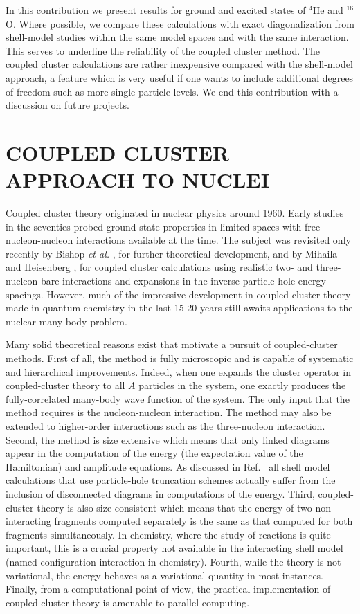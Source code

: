 \documentclass[fleqn,12pt,twoside]{article}
\begin{document}
In this contribution we present results for ground and excited states of $^{4}$He and
$^{16}$O. Where possible, we compare these calculations with exact diagonalization from 
shell-model studies
within the same model spaces and with the same interaction. This serves to underline the reliability of the 
coupled cluster method. The coupled cluster calculations are rather 
inexpensive compared with the shell-model approach, a feature which is very useful if 
one wants to include additional degrees of freedom such as more single particle levels. We end this contribution 
with a discussion on future projects.

\section{COUPLED CLUSTER APPROACH TO NUCLEI}


Coupled cluster theory originated in nuclear physics
\cite{coester58} around 1960.  Early studies in the
seventies \cite{klz78} probed ground-state properties in limited
spaces with free nucleon-nucleon interactions available at the
time. The subject was revisited
only recently by Bishop {\it et al.}
\cite{ticcm}, for further theoretical development, and by Mihaila and
Heisenberg \cite{hm99}, for coupled cluster calculations
using realistic
two- and three-nucleon
bare interactions
and expansions in the
inverse particle-hole energy spacings.
However, much of
the impressive development in
coupled cluster theory made in quantum chemistry in
the last 15-20 years
\cite{comp_chem_rev00,Bartlett95,Piecuch02a,Piecuch02b}
still awaits applications to the nuclear many-body problem.

Many solid theoretical reasons exist that motivate a pursuit of
coupled-cluster methods. First of all, the method is fully
microscopic and is capable of systematic and hierarchical improvements.
Indeed, when one expands the cluster operator in coupled-cluster theory
to all $A$ particles in the system, one exactly produces the fully-correlated
many-body wave function of the system. The only input that the method
requires is the nucleon-nucleon interaction. 
The method may also be extended
to higher-order interactions such as the three-nucleon interaction.
Second, the method is size extensive which means that only linked
diagrams appear in the computation of the  
energy (the expectation value of the Hamiltonian) and amplitude equations.
As discussed in Ref.~\cite{comp_chem_rev00} all shell model calculations
that use particle-hole truncation schemes
actually suffer from the inclusion of disconnected diagrams
in computations of the energy.
Third, coupled-cluster theory is also size
consistent which means that the energy of two non-interacting fragments
computed separately is the same as that computed for both fragments
simultaneously. In chemistry, where the study of reactions
is quite important, this is a crucial property not available
in the interacting shell model (named configuration interaction in
chemistry).
Fourth, while the theory
is not variational,
the energy behaves as a variational quantity in most instances.
Finally, from a
computational point of view, the practical implementation of coupled
cluster theory is amenable to parallel computing. 
\end{document}
